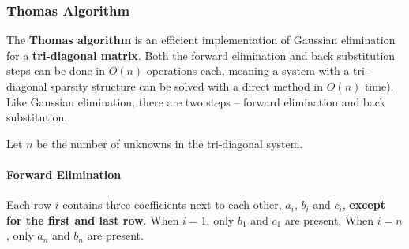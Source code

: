 \documentclass{article}
\begin{document}
\subsubsection{Thomas Algorithm}

The \textbf{Thomas algorithm} is an efficient implementation of Gaussian elimination for a \textbf{tri-diagonal matrix}. Both the forward elimination and back substitution steps can be done in $O(n)$ operations each, meaning a system with a tri-diagonal sparsity structure can be solved with a direct method in $O(n)$ time). Like Gaussian elimination, there are two steps -- forward elimination and back substitution.

Let $n$ be the number of unknowns in the tri-diagonal system.

\paragraph{\textbf{Forward Elimination}} Each row $i$ contains three coefficients next to each other, $a_i$, $b_i$ and $c_i$, \textbf{except for the first and last row}. When $i = 1$, only $b_1$ and $c_1$ are present. When $i = n$, only $a_n$ and $b_n$ are present.
\end{document}
